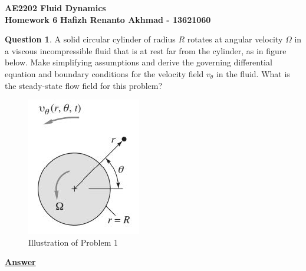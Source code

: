 \documentclass[10pt]{article}
\begin{document}

\begin{center}
    \textbf{AE2202 Fluid Dynamics} \\
    \textbf{Homework 6}
    \textbf{Hafizh Renanto Akhmad - 13621060}
\end{center}

\hfill

\textbf{Question 1}. A solid circular cylinder of radius $R$ rotates at angular velocity $\Omega$ in a viscous incompressible fluid that is at rest far from the cylinder, as in figure below. Make simplifying assumptions and derive the governing differential equation and boundary conditions for the velocity field $v_\theta$ in the fluid. What is the steady-state flow field for this problem?

\begin{figure}[h]
    \centering
    \includegraphics{Problem1.jpg}
    \caption{Illustration of Problem 1}
    \label{fig:figprob1}
\end{figure}

\textbf{\underline{Answer}}
\end{document}
